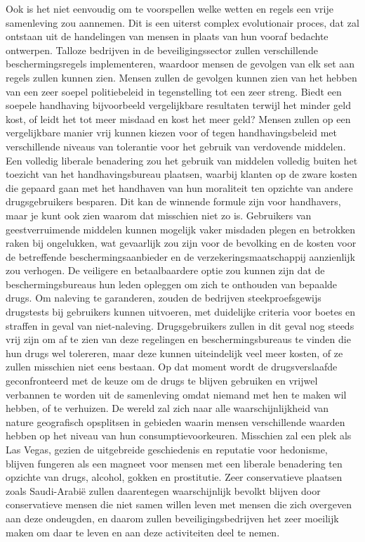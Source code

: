 \documentclass[
  a5paper,
  smalldemyvopaper,11pt,twoside,onecolumn,openright,extrafontsizes,
hidelinks]{memoir}
\begin{document}
Ook is het niet eenvoudig om te voorspellen welke wetten en regels een
vrije samenleving zou aannemen. Dit is een uiterst complex evolutionair
proces, dat zal ontstaan uit de handelingen van mensen in plaats van hun
vooraf bedachte ontwerpen. Talloze bedrijven in de beveiligingssector
zullen verschillende beschermingsregels implementeren, waardoor mensen
de gevolgen van elk set aan regels zullen kunnen zien. Mensen zullen de
gevolgen kunnen zien van het hebben van een zeer soepel politiebeleid in
tegenstelling tot een zeer streng. Biedt een soepele handhaving
bijvoorbeeld vergelijkbare resultaten terwijl het minder geld kost, of
leidt het tot meer misdaad en kost het meer geld? Mensen zullen op een
vergelijkbare manier vrij kunnen kiezen voor of tegen handhavingsbeleid
met verschillende niveaus van tolerantie voor het gebruik van verdovende
middelen. Een volledig liberale benadering zou het gebruik van middelen
volledig buiten het toezicht van het handhavingsbureau plaatsen, waarbij
klanten op de zware kosten die gepaard gaan met het handhaven van hun
moraliteit ten opzichte van andere drugsgebruikers besparen. Dit kan de
winnende formule zijn voor handhavers, maar je kunt ook zien waarom dat
misschien niet zo is. Gebruikers van geestverruimende middelen kunnen
mogelijk vaker misdaden plegen en betrokken raken bij ongelukken, wat
gevaarlijk zou zijn voor de bevolking en de kosten voor de betreffende
beschermingsaanbieder en de verzekeringsmaatschappij aanzienlijk zou
verhogen. De veiligere en betaalbaardere optie zou kunnen zijn dat de
beschermingsbureaus hun leden opleggen om zich te onthouden van bepaalde
drugs. Om naleving te garanderen, zouden de bedrijven steekproefsgewijs
drugstests bij gebruikers kunnen uitvoeren, met duidelijke criteria voor
boetes en straffen in geval van niet-naleving. Drugsgebruikers zullen in
dit geval nog steeds vrij zijn om af te zien van deze regelingen en
beschermingsbureaus te vinden die hun drugs wel tolereren, maar deze
kunnen uiteindelijk veel meer kosten, of ze zullen misschien niet eens
bestaan. Op dat moment wordt de drugsverslaafde geconfronteerd met de
keuze om de drugs te blijven gebruiken en vrijwel verbannen te worden
uit de samenleving omdat niemand met hen te maken wil hebben, of te
verhuizen. De wereld zal zich naar alle waarschijnlijkheid van nature
geografisch opsplitsen in gebieden waarin mensen verschillende waarden
hebben op het niveau van hun consumptievoorkeuren. Misschien zal een
plek als Las Vegas, gezien de uitgebreide geschiedenis en reputatie voor
hedonisme, blijven fungeren als een magneet voor mensen met een liberale
benadering ten opzichte van drugs, alcohol, gokken en prostitutie. Zeer
conservatieve plaatsen zoals Saudi-Arabië zullen daarentegen
waarschijnlijk bevolkt blijven door conservatieve mensen die niet samen
willen leven met mensen die zich overgeven aan deze ondeugden, en daarom
zullen beveiligingsbedrijven het zeer moeilijk maken om daar te leven en
aan deze activiteiten deel te nemen.
\end{document}
